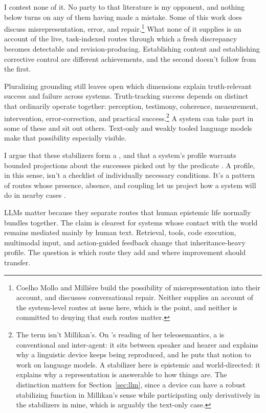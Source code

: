\documentclass[12pt]{article}
\begin{document}
I contest none of it. No party to that literature is my opponent, and nothing
below turns on any of them having made a mistake. Some of this work does discuss misrepresentation, error, and
repair.\footnote{Coelho Mollo and Millière build the possibility of misrepresentation into
their account, and \textcite{attah_2025_do_language_models_lack_communicative_intentions}
discusses conversational repair. Neither supplies an account of the system-level routes at
issue here, which is the point, and neither is committed to denying that such routes
matter.} What none of it supplies is an account of the live, task-indexed routes through
which a fresh discrepancy becomes detectable and revision-producing. Establishing content
and establishing corrective control are different achievements, and the second doesn't
follow from the first.

Pluralizing grounding still leaves open which dimensions explain truth-relevant success
and failure across systems. Truth-tracking success depends on distinct
 that ordinarily operate together: perception, testimony,
coherence, measurement, intervention, error-correction, and practical
success.\footnote{The term isn't Millikan's. On
\textcite{grindrod_2024_large_language_models_linguistic_intentionality}'s reading of her
teleosemantics, a  is conventional and inter-agent: it sits
between speaker and hearer and explains why a linguistic device keeps being reproduced,
and he puts that notion to work on language models. A stabilizer here is epistemic and
world-directed: it explains why a
representation is answerable to how things are. The distinction matters for
Section~\ref{sec:llm}, since a device can have a robust stabilizing function in
Millikan's sense while participating only derivatively in the stabilizers in mine, which
is arguably the text-only case.} A system
can take part in some of these and sit out others. Text-only and weakly tooled language
models make that possibility especially visible.

I argue that these stabilizers form a , and that a system's profile
warrants bounded projections about the successes picked out by the predicate
. A profile, in
this sense, isn't a checklist of individually necessary conditions. It's a pattern of
routes whose presence, absence, and coupling let us project how a system will do in
nearby cases \citep{Goodman1955,khalidi2013}.

LLMs matter because they separate routes that human epistemic life normally bundles
together. The claim is clearest for systems whose contact with the world remains mediated
mainly by human text. Retrieval, tools, code execution, multimodal input, and
action-guided feedback change that inheritance-heavy profile. The question is which route
they add and where improvement should transfer.
\end{document}
